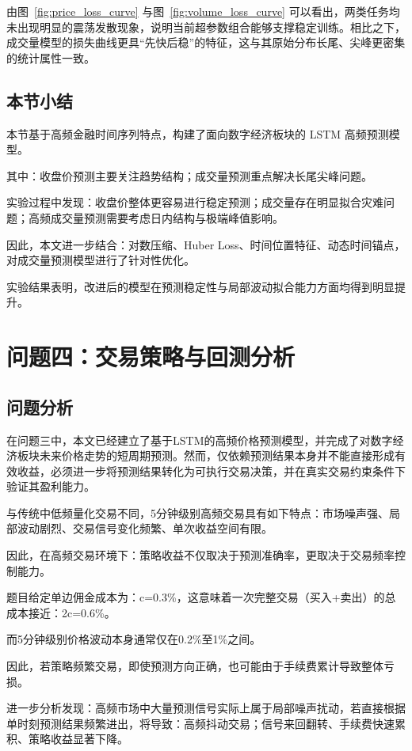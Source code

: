 \documentclass[withoutpreface,bwprint]{cumcmthesis}
\begin{document}
由图~\ref{fig:price_loss_curve} 与图~\ref{fig:volume_loss_curve} 可以看出，两类任务均未出现明显的震荡发散现象，说明当前超参数组合能够支撑稳定训练。相比之下，成交量模型的损失曲线更具“先快后稳”的特征，这与其原始分布长尾、尖峰更密集的统计属性一致。

\subsection{本节小结}

本节基于高频金融时间序列特点，构建了面向数字经济板块的 LSTM 高频预测模型。

其中：收盘价预测主要关注趋势结构；成交量预测重点解决长尾尖峰问题。

实验过程中发现：收盘价整体更容易进行稳定预测；成交量存在明显拟合灾难问题；高频成交量预测需要考虑日内结构与极端峰值影响。

因此，本文进一步结合：对数压缩、Huber Loss、时间位置特征、动态时间锚点，对成交量预测模型进行了针对性优化。

实验结果表明，改进后的模型在预测稳定性与局部波动拟合能力方面均得到明显提升。

\section{问题四：交易策略与回测分析}

\subsection{问题分析}

在问题三中，本文已经建立了基于LSTM的高频价格预测模型，并完成了对数字经济板块未来价格走势的短周期预测。然而，仅依赖预测结果本身并不能直接形成有效收益，必须进一步将预测结果转化为可执行交易决策，并在真实交易约束条件下验证其盈利能力。

与传统中低频量化交易不同，5分钟级别高频交易具有如下特点：市场噪声强、局部波动剧烈、交易信号变化频繁、单次收益空间有限。

因此，在高频交易环境下：策略收益不仅取决于预测准确率，更取决于交易频率控制能力。

题目给定单边佣金成本为：c=0.3\%，这意味着一次完整交易（买入+卖出）的总成本接近：2c=0.6\%。

而5分钟级别价格波动本身通常仅在0.2\%至1\%之间。

因此，若策略频繁交易，即使预测方向正确，也可能由于手续费累计导致整体亏损。

进一步分析发现：高频市场中大量预测信号实际上属于局部噪声扰动，若直接根据单时刻预测结果频繁进出，将导致：高频抖动交易；信号来回翻转、手续费快速累积、策略收益显著下降。
\end{document}

